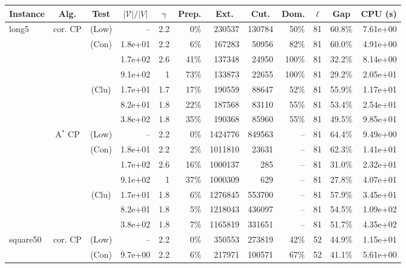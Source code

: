 \documentclass[11pt]{amsart}
\newenvironment{outdent}
{\begin{list}{}{\leftmargin-2cm\rightmargin\leftmargin}\centering\item\relax}
{\end{list}\ignorespacesafterend}
\theoremstyle{plain}
\theoremstyle{remark}
\begin{document}
\begin{table}
\begin{outdent}
\begin{small}
\begin{tabular}{|l|ccr|rr|rrr|rr|r|}
\hline
Instance  
& \multicolumn{1}{c}{Alg.} 
& \multicolumn{1}{c}{Test} 
& \multicolumn{1}{c|}{$|\mathcal{V}|/|V|$}
& \multicolumn{1}{c}{$\gamma$} 
& \multicolumn{1}{c|}{Prep.} 
& \multicolumn{1}{c}{Ext.} 
& \multicolumn{1}{c}{Cut.} 
& \multicolumn{1}{c|}{Dom.} 
& \multicolumn{1}{c}{$\ell$} 
& \multicolumn{1}{c|}{Gap} 
& \multicolumn{1}{c|}{CPU (s)} \\
\hline
long5 & cor. CP & (Low) & --  &2.2 & 0\% & 230537 & 130784 & 50\% &81 & 60.8\% & 7.61e+00 \\
& & (Con) & 1.8e+01 & 2.2 & 6\% & 167283 & 50956 & 82\% &81 & 60.0\% & 4.91e+00 \\
& &  & 1.7e+02 & 2.6 & 41\% & 137348 & 24950 & 100\% &81 & 32.2\% & 8.14e+00 \\
& &  & 9.1e+02 & 1 & 73\% & 133873 & 22655 & 100\% &81 & 29.2\% & 2.05e+01 \\
& & (Clu) & 1.7e+01 & 1.7 & 17\% & 190559 & 88647 & 52\% &81 & 55.9\% & 1.17e+01 \\
& &  & 8.2e+01 & 1.8 & 22\% & 187568 & 83110 & 55\% &81 & 53.4\% & 2.54e+01 \\
& &  & 3.8e+02 & 1.8 & 35\% & 190368 & 85960 & 55\% &81 & 49.5\% & 9.85e+01 \\
&A$^*$ CP & (Low) & --  &2.2 & 0\% & 1424776 & 849563 & -- &81 & 64.4\% & 9.49e+00 \\
& & (Con) & 1.8e+01 & 2.2 & 2\% & 1011810 & 23631 & -- &81 & 62.3\% & 1.41e+01 \\
& &  & 1.7e+02 & 2.6 & 16\% & 1000137 & 285 & -- &81 & 31.0\% & 2.32e+01 \\
& &  & 9.1e+02 & 1 & 37\% & 1000309 & 629 & -- &81 & 27.8\% & 4.07e+01 \\
& & (Clu) & 1.7e+01 & 1.8 & 6\% & 1276845 & 553700 & -- &81 & 57.9\% & 3.45e+01 \\
& &  & 8.2e+01 & 1.8 & 5\% & 1218043 & 436097 & -- &81 & 54.5\% & 1.09e+02 \\
& &  & 3.8e+02 & 1.8 & 7\% & 1165819 & 331651 & -- &81 & 51.7\% & 4.35e+02 \\
\hline
square50 & cor. CP & (Low) & --  &2.2 & 0\% & 350553 & 273819 & 42\% &52 & 44.9\% & 1.15e+01 \\
& & (Con) & 9.7e+00 & 2.2 & 6\% & 217971 & 100571 & 67\% &52 & 41.1\% & 5.61e+00 \\

\end{tabular}
\end{small}
\end{outdent}
\end{table}
\end{document}
